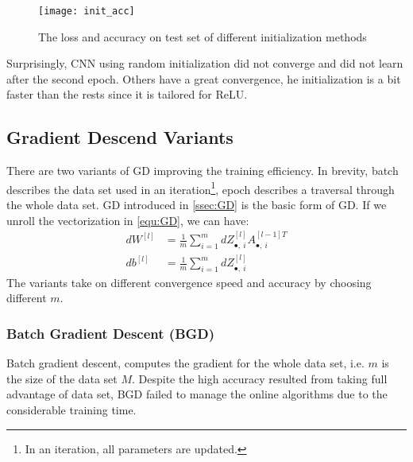 \begin{figure}[H]
    \centering
    \texttt{[image: init\_acc]}
    \caption{\label{fig:init_acc}The loss and accuracy on test set 
    of different initialization methods}
\end{figure}

\par Surprisingly, CNN using random initialization did not 
converge and did not learn after the second epoch. Others have
a great convergence, he initialization is a bit faster than the 
rests since it is tailored for ReLU.  

\subsection{Gradient Descend Variants}
There are two variants of GD improving the training efficiency. In brevity,
batch describes the data set used in an iteration\footnote{In an iteration, 
all parameters are updated.}, epoch describes a traversal through the whole 
data set. GD introduced in \autoref{ssec:GD} is the basic form of GD. If 
we unroll the vectorization in \autoref{equ:GD}, we can have:
\begin{equation}
    \begin{split}
        dW^{[l]} & = \frac{1}{m}\sum\limits_{i=1}^mdZ_{\bullet,\ i}^{[l]}A_{\bullet,\ i}^{[l-1]T} \\
        db^{[l]} & = \frac{1}{m}\sum\limits_{i=1}^mdZ_{\bullet,\ i}^{[l]}
    \end{split}
\end{equation}  
The variants take on different convergence speed and accuracy by choosing 
different $ m $.

\subsubsection{Batch Gradient Descent (BGD)}
Batch gradient descent, computes the gradient for the whole data set, i.e. 
$ m $ is the size of the data set $ M $. Despite the high accuracy resulted 
from taking full advantage of data set, BGD failed to 
manage the online algorithms due to the considerable training time.

